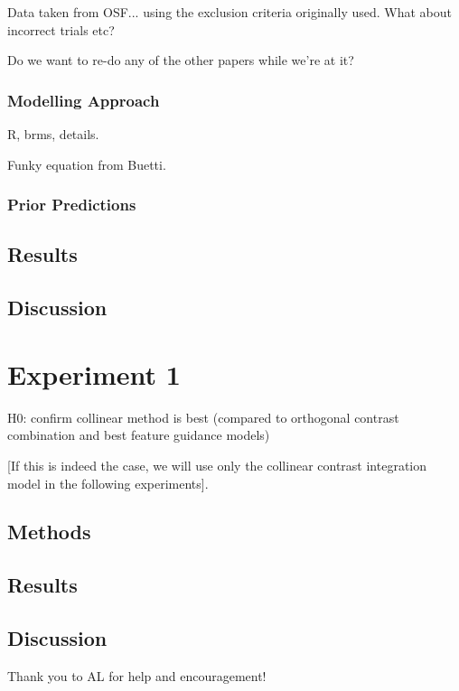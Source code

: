 Data taken from OSF... using the exclusion criteria originally used. What about incorrect trials etc? 

Do we want to re-do any of the other papers while we're at it?

\subsubsection{Modelling Approach}

R, brms, details.

Funky equation from Buetti. 

\subsubsection{Prior Predictions}

\subsection{Results}

\subsection{Discussion}


\section{Experiment 1}

H0: confirm collinear method is best (compared to orthogonal contrast combination and best feature guidance models)

[If this is indeed the case, we will use only the collinear contrast integration model in the following experiments].

\subsection{Methods}

\subsection{Results}

\subsection{Discussion}



\begin{acknowledgements}
Thank you to AL for help and encouragement! 
\end{acknowledgements}


